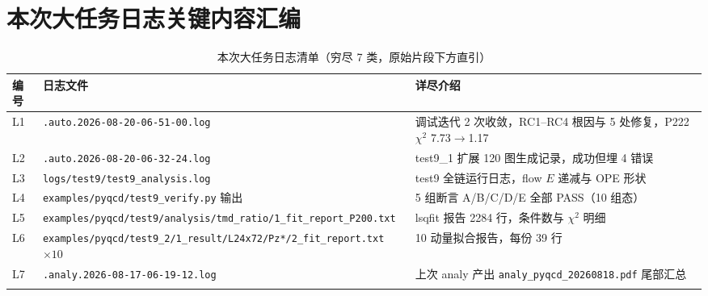 \documentclass[UTF8]{ctexart}
\begin{document}
\section{本次大任务日志关键内容汇编}
\label{sec:logs}
\small
\begin{xltabular}{\textwidth}{llX}
\toprule
编号 & 日志文件 & 详尽介绍 \\
\midrule
\endhead
L1 & \texttt{\nolinkurl{.auto.2026-08-20-06-51-00.log}} & 调试迭代 2 次收敛，RC1--RC4 根因与 5 处修复，P222 $\chi^2$ 7.73$\to$1.17 \\
L2 & \texttt{\nolinkurl{.auto.2026-08-20-06-32-24.log}} & test9\_1 扩展 120 图生成记录，成功但埋 4 错误 \\
L3 & \texttt{\nolinkurl{logs/test9/test9\_analysis.log}} & test9 全链运行日志，flow $E$ 递减与 OPE 形状 \\
L4 & \texttt{\nolinkurl{examples/pyqcd/test9\_verify.py}} 输出 & 5 组断言 A/B/C/D/E 全部 PASS（10 组态）\\
L5 & \texttt{\nolinkurl{examples/pyqcd/test9/analysis/tmd\_ratio/1\_fit\_report\_P200.txt}} & lsqfit 报告 2284 行，条件数与 $\chi^2$ 明细 \\
L6 & \texttt{\nolinkurl{examples/pyqcd/test9\_2/1\_result/L24x72/Pz*/2\_fit\_report.txt}} $\times10$ & 10 动量拟合报告，每份 39 行 \\
L7 & \texttt{\nolinkurl{.analy.2026-08-17-06-19-12.log}} & 上次 analy 产出 \texttt{\nolinkurl{analy\_pyqcd\_20260818.pdf}} 尾部汇总 \\
\bottomrule
\caption{本次大任务日志清单（穷尽 7 类，原始片段下方直引）}
\end{xltabular}




\end{document}
